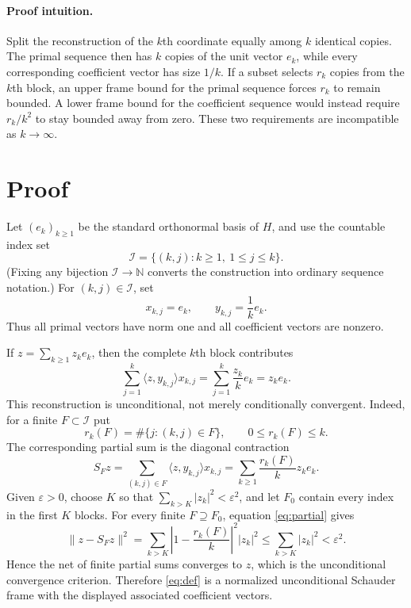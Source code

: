 \documentclass[11pt,a4paper]{article}
\newcommand{\N}{\mathbb N}
\newcommand{\I}{\mathcal I}
\begin{document}
\paragraph{Proof intuition.}
Split the reconstruction of the $k$th coordinate equally among $k$ identical
copies.  The primal sequence then has $k$ copies of the unit vector $e_k$,
while every corresponding coefficient vector has size $1/k$.  If a subset
selects $r_k$ copies from the $k$th block, an upper frame bound for the primal
sequence forces $r_k$ to remain bounded.  A lower frame bound for the
coefficient sequence would instead require $r_k/k^2$ to stay bounded away
from zero.  These two requirements are incompatible as $k\to\infty$.

\section*{Proof}
Let $(e_k)_{k\ge1}$ be the standard orthonormal basis of $H$, and use the
countable index set
\[
 \I=\{(k,j): k\ge1,\ 1\le j\le k\}.
\]
(Fixing any bijection $\I\to\N$ converts the construction into ordinary
sequence notation.)  For $(k,j)\in\I$, set
\begin{equation}\label{eq:def}
 x_{k,j}=e_k,
 \qquad
 y_{k,j}=\frac1k e_k.
\end{equation}
Thus all primal vectors have norm one and all coefficient vectors are
nonzero.

If $z=\sum_{k\ge1}z_ke_k$, then the complete $k$th block contributes
\[
 \sum_{j=1}^k\langle z,y_{k,j}\rangle x_{k,j}
 =\sum_{j=1}^k\frac{z_k}{k}e_k=z_ke_k.
\]
This reconstruction is unconditional, not merely conditionally convergent.
Indeed, for a finite $F\subset\I$ put
\[
 r_k(F)=\#\{j:(k,j)\in F\},
 \qquad 0\le r_k(F)\le k.
\]
The corresponding partial sum is the diagonal contraction
\begin{equation}\label{eq:partial}
 S_Fz=\sum_{(k,j)\in F}\langle z,y_{k,j}\rangle x_{k,j}
     =\sum_{k\ge1}\frac{r_k(F)}k z_ke_k.
\end{equation}
Given $\varepsilon>0$, choose $K$ so that
$\sum_{k>K}|z_k|^2<\varepsilon^2$, and let $F_0$ contain every index in the
first $K$ blocks.  For every finite $F\supseteq F_0$, equation
\eqref{eq:partial} gives
\[
 \lVert z-S_Fz\rVert^2
 =\sum_{k>K}\left|1-\frac{r_k(F)}k\right|^2|z_k|^2
 \le \sum_{k>K}|z_k|^2<\varepsilon^2.
\]
Hence the net of finite partial sums converges to $z$, which is the
unconditional convergence criterion.  Therefore \eqref{eq:def} is a
normalized unconditional Schauder frame with the displayed associated
coefficient vectors.
\end{document}
